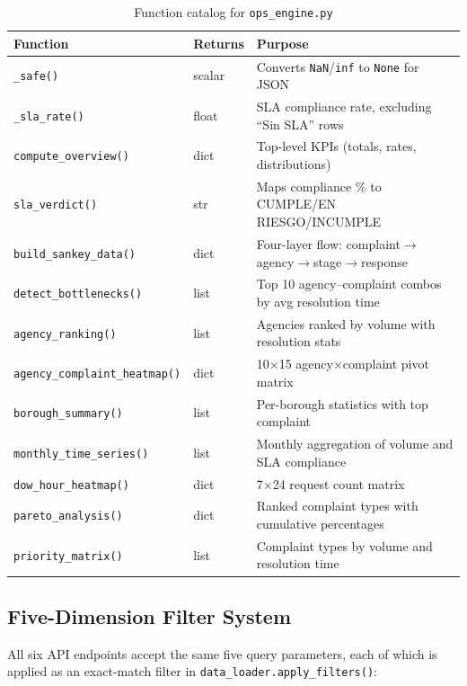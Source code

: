 \begin{table}[h]
\centering
\caption{Function catalog for \texttt{ops\_engine.py}}
\label{tab:ops-engine-functions}
\begin{tabularx}{\textwidth}{llX}
\toprule
\textbf{Function} & \textbf{Returns} & \textbf{Purpose} \\
\midrule
\texttt{\_safe()} & scalar & Converts \texttt{NaN}/\texttt{inf} to \texttt{None} for JSON \\
\texttt{\_sla\_rate()} & float & SLA compliance rate, excluding ``Sin SLA'' rows \\
\texttt{compute\_overview()} & dict & Top-level KPIs (totals, rates, distributions) \\
\texttt{sla\_verdict()} & str & Maps compliance \% to CUMPLE/EN RIESGO/INCUMPLE \\
\texttt{build\_sankey\_data()} & dict & Four-layer flow: complaint$\to$agency$\to$stage$\to$response \\
\texttt{detect\_bottlenecks()} & list & Top 10 agency--complaint combos by avg resolution time \\
\texttt{agency\_ranking()} & list & Agencies ranked by volume with resolution stats \\
\texttt{agency\_complaint\_heatmap()} & dict & 10$\times$15 agency$\times$complaint pivot matrix \\
\texttt{borough\_summary()} & list & Per-borough statistics with top complaint \\
\texttt{monthly\_time\_series()} & list & Monthly aggregation of volume and SLA compliance \\
\texttt{dow\_hour\_heatmap()} & dict & 7$\times$24 request count matrix \\
\texttt{pareto\_analysis()} & dict & Ranked complaint types with cumulative percentages \\
\texttt{priority\_matrix()} & list & Complaint types by volume and resolution time \\
\bottomrule
\end{tabularx}
\end{table}

\subsection{Five-Dimension Filter System}

All six API endpoints accept the same five query parameters, each of which is applied as an exact-match filter in \texttt{data\_loader.apply\_filters()}:

